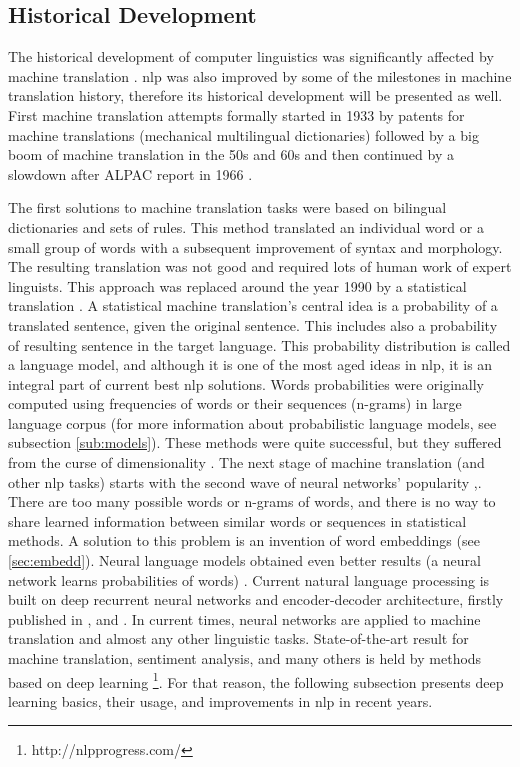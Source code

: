 \subsection{Historical Development}
The historical development of computer linguistics was significantly affected by machine translation \citep{Wilks}. \acrshort{nlp} was also improved by some of the milestones in machine translation history, therefore its historical development will be presented as well. First machine translation attempts formally started in 1933 by patents for machine translations (mechanical multilingual dictionaries) \citep{Hutchins}
followed by a big boom of machine translation in the 50s and 60s and then continued by a slowdown after ALPAC report in 1966 \citep{Hutchins1996}. 

The first solutions to machine translation tasks were based on bilingual dictionaries and sets of rules. This method translated an individual word or a small group of words with a subsequent improvement of syntax and morphology. The resulting translation was not good and required lots of human work of expert linguists. This approach was replaced around the year 1990 by a statistical translation \citep{Brown}. A statistical machine translation's central idea is a probability of a translated sentence, given the original sentence. This includes also a probability of resulting sentence in the target language. This probability distribution is called a language model, and although it is one of the most aged ideas in \acrshort{nlp}, it is an integral part of current best \acrshort{nlp} solutions. Words probabilities were originally computed using frequencies of words or their sequences (n-grams) in large language corpus \citep{jurafsky2012natural} (for more information about probabilistic language models, see subsection \ref{sub:models}). These methods were quite successful, but they suffered from the curse of dimensionality \citep[p.450]{Goodfellow-et-al-2016}. The next stage of machine translation (and other \acrshort{nlp} tasks) starts with the second wave of neural networks' popularity \citep{Goldberg},\citep{Google}. There are too many possible words or n-grams of words, and there is no way to share learned information between similar words or sequences in statistical methods. A solution to this problem is an invention of word embeddings \citep{Bengio2003} (see \ref{sec:embedd}). Neural language models obtained even better results (a neural network learns probabilities of words) \citep{Schwenk2006}. Current natural language processing is built on deep recurrent neural networks and encoder-decoder architecture, firstly published in \citep{Cho2014}, \citep{Sutskever2014} and \citep{Wu2016}. In current times, neural networks are applied to machine translation and almost any other linguistic tasks. State-of-the-art result for machine translation, sentiment analysis, and many others is held by methods based on deep learning \footnote{http://\acrshort{nlp}progress.com/}. For that reason, the following subsection presents deep learning basics, their usage, and improvements in \acrshort{nlp} in recent years. %
